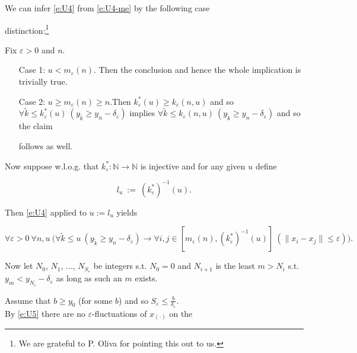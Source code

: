 \documentclass[1p]{elsarticle}
\newcommand{\NN}{\ensuremath{\mathbb{N}}}
\theoremstyle{plain}
\theoremstyle{definition}
\theoremstyle{remark}
\renewcommand{\epsilon}{\varepsilon}
\theoremstyle{definition}
\begin{document}
{We can infer \eqref{e:U4} from \eqref{e:U4-me} by the following case 

distinction:\footnote{We are grateful to P. Oliva for pointing this out to us.}

Fix $\varepsilon >0$ and $n.$ 

\begin{itemize}

\item[Case]  1: $u<m_\epsilon(n)$. Then the conclusion and hence the whole implication is trivially true.

\item[Case]  2: $u\geq m_\epsilon(n) \geq n$.Then $k^*_\epsilon(u)\geq 

k_\epsilon(n,u)$ and so $\forall \tilde k\le k^*_\epsilon(u)\ 

(y_{\tilde k}\geq y_n-\delta_\epsilon)$ implies $\forall \tilde k\le 

k_\epsilon(n,u)\ (y_{\tilde k}\geq y_n-\delta_\epsilon)$ and so the claim 

follows as well.

\end{itemize}



Now suppose w.l.o.g. that $k^*_\epsilon:\NN\to\NN$ is injective and for any given $u$ define

\[

l_u\ :=\ (k^*_\epsilon)^{-1}(u).

\]

Then \eqref{e:U4} applied to $u:=l_u$ yields

\[

\forall \epsilon>0\ \forall n,u\ \Big( \forall \tilde k\le u\ 

(y_{\tilde k}\geq y_n-\delta_\epsilon)\rightarrow 

 \forall i,j\in[m_\epsilon(n),(k^*_\epsilon)^{-1}(u)]\ 

(\|x_i-x_j\|\leq \epsilon) \Big).

\tag{-}\label{e:U5}\]

Now let $N_0$, $N_1$, ..., $N_{S_\epsilon}$ be integers s.t. $N_0=0$ and $N_{i+1}$ is the least $m>N_i$ s.t. $y_m<y_{N_i}-\delta_\epsilon$ as long as such an $m$ exists.

Assume that $b\geq y_0$ (for some $b$) and so $S_\epsilon\leq\frac{b}{\delta_\epsilon}$.\\

By \eqref{e:U5} there are no $\epsilon$-fluctuations of $x_{(\cdot)}$ on the 

}
\end{document}

